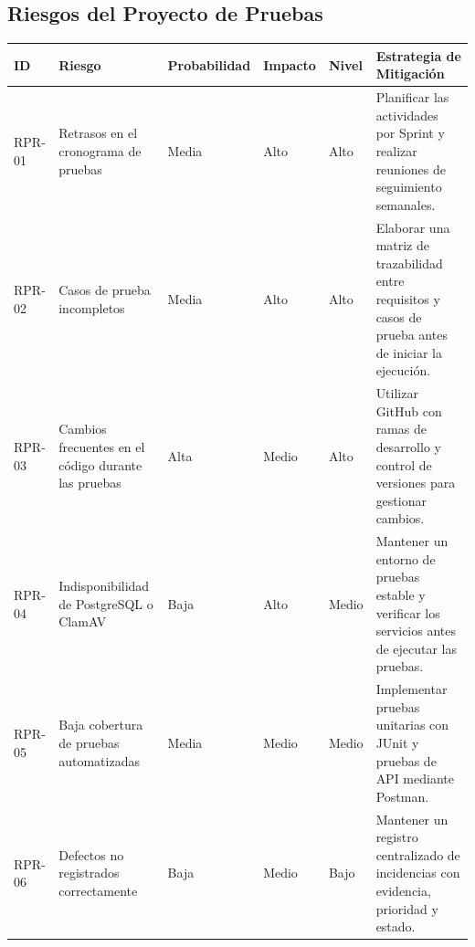 \subsection*{Riesgos del Proyecto de Pruebas}
\begin{longtable}{|p{1.5cm}|p{3.5cm}|p{2.5cm}|p{2cm}|p{2cm}|p{4cm}|}
\hline
\textbf{ID} & \textbf{Riesgo} & \textbf{Probabilidad} & \textbf{Impacto} & \textbf{Nivel} & \textbf{Estrategia de Mitigación} \\
\hline
RPR-01 & Retrasos en el cronograma de pruebas & Media & Alto & Alto & Planificar las actividades por Sprint y realizar reuniones de seguimiento semanales. \\
\hline
RPR-02 & Casos de prueba incompletos & Media & Alto & Alto & Elaborar una matriz de trazabilidad entre requisitos y casos de prueba antes de iniciar la ejecución. \\
\hline
RPR-03 & Cambios frecuentes en el código durante las pruebas & Alta & Medio & Alto & Utilizar GitHub con ramas de desarrollo y control de versiones para gestionar cambios. \\
\hline
RPR-04 & Indisponibilidad de PostgreSQL o ClamAV & Baja & Alto & Medio & Mantener un entorno de pruebas estable y verificar los servicios antes de ejecutar las pruebas. \\
\hline
RPR-05 & Baja cobertura de pruebas automatizadas & Media & Medio & Medio & Implementar pruebas unitarias con JUnit y pruebas de API mediante Postman. \\
\hline
RPR-06 & Defectos no registrados correctamente & Baja & Medio & Bajo & Mantener un registro centralizado de incidencias con evidencia, prioridad y estado. \\
\hline
\end{longtable}

